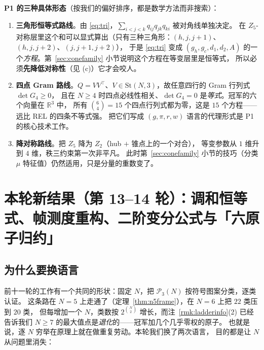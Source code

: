 \documentclass[UTF8,11pt]{ctexart}
\theoremstyle{definition}
\newcommand{\R}{\mathbb{R}}
\begin{document}
\textbf{P1 的三种具体形态}（按我们的偏好排序，都是数学方法而非搜索）：
\begin{enumerate}[label=(\alph*),leftmargin=2.2em]
\item \textbf{三角形恒等式路线}。由 \eqref{eq:tri}，$\sum_{i<j<k}q_{ij}q_{jk}q_{ki}$ 被对角线单独决定。
在 $Z_5$-对称层里这个和可以显式算出（只有三种三角形：$(h,j,j{+}1)$、$(h,j,j{+}2)$、$(j,j{+}1,j{+}2)$），
于是 \eqref{eq:tri} 变成 $(g_h,g_c,d_1,d_2,A)$ 的一个\emph{方程}。第~\ref{sec:conefamily} 小节说明这个方程在等变层里是恒等式，
所以必须\textbf{先降低对称性}（见 (c)）它才会咬人。
\item \textbf{四点 Gram 路线}。$Q=VV^\top$、$V\in\mathrm{St}(N,3)$，故任意四行的 Gram 行列式 $\det G_4\ge0$，
且在 $N\ge4$ 时四点必线性相关、$\det G_4=0$ 是\emph{等式}。冠军的六个向量在 $\R^3$ 中，
所有 $\binom64=15$ 个四点行列式都为零，这是 $15$ 个方程——远比 REL 的四条不等式强。
把它们写成 $(g,\pi,r,w)$ 语言的代理形式是 P1 的核心技术工作。
\item \textbf{降对称路线}。把 $Z_5$ 降为 $Z_2$（hub $+$ 锥点上的一个对合），
等变参数从 $1$ 维升到 $4$ 维，秩三约束第一次非平凡。
此时第~\ref{sec:conefamily} 小节的技巧（分类 $\mu$ 特征值）仍然适用，只是分量的重数变了。
\end{enumerate}

\section{本轮新结果（第 13--14 轮）：调和恒等式、帧测度重构、二阶变分公式与「六原子归约」}\label{sec:harm}

\subsection{为什么要换语言}\label{sec:harm:motiv}

前十一轮的工作有一个共同的形状：固定 $N$，把 $\mathcal P_3(N)$ 按符号图案分类，逐类认证。
这条路在 $N=5$ 上走通了（定理~\ref{thm:n5frame}），在 $N=6$ 上把 $22$ 类压到 $20$ 类，
但每增加一个 $N$，类数按 $2^{\binom N2}$ 增长，而注~\ref{rmk:ladderinfo}(2) 已经告诉我们
$N\ge7$ 的最大值点是\emph{退化}的——冠军加几个几乎零权的原子。
也就是说，逐 $N$ 穷举在原理上就在做重复劳动。本轮我们换了两次语言，
目的都是让 $N$ 从问题里消失：
\end{document}
